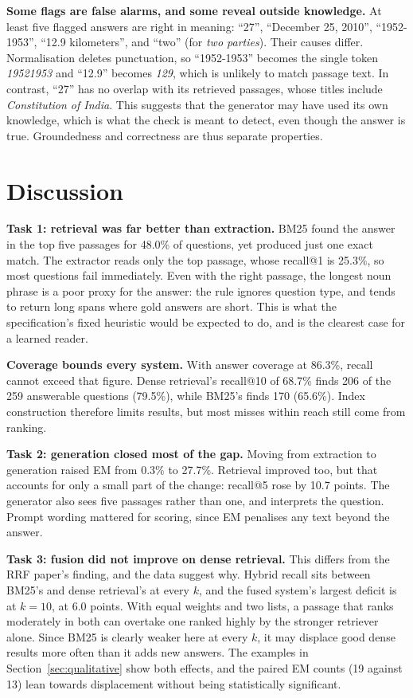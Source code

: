 \documentclass[11pt,a4paper]{article}
\begin{document}
\textbf{Some flags are false alarms, and some reveal outside knowledge.} At least five flagged answers are right in meaning: ``27'', ``December 25, 2010'', ``1952-1953'', ``12.9 kilometers'', and ``two'' (for \emph{two parties}). Their causes differ. Normalisation deletes punctuation, so ``1952-1953'' becomes the single token \emph{19521953} and ``12.9'' becomes \emph{129}, which is unlikely to match passage text. In contrast, ``27'' has no overlap with its retrieved passages, whose titles include \emph{Constitution of India}. This suggests that the generator may have used its own knowledge, which is what the check is meant to detect, even though the answer is true. Groundedness and correctness are thus separate properties.

\section{Discussion}
\label{sec:discussion}

\textbf{Task 1: retrieval was far better than extraction.} BM25 found the answer in the top five passages for 48.0\% of questions, yet produced just one exact match. The extractor reads only the top passage, whose recall@1 is 25.3\%, so most questions fail immediately. Even with the right passage, the longest noun phrase is a poor proxy for the answer: the rule ignores question type, and tends to return long spans where gold answers are short. This is what the specification's fixed heuristic would be expected to do, and is the clearest case for a learned reader.

\textbf{Coverage bounds every system.} With answer coverage at 86.3\%, recall cannot exceed that figure. Dense retrieval's recall@10 of 68.7\% finds 206 of the 259 answerable questions (79.5\%), while BM25's finds 170 (65.6\%). Index construction therefore limits results, but most misses within reach still come from ranking.

\textbf{Task 2: generation closed most of the gap.} Moving from extraction to generation raised EM from 0.3\% to 27.7\%. Retrieval improved too, but that accounts for only a small part of the change: recall@5 rose by 10.7 points. The generator also sees five passages rather than one, and interprets the question. Prompt wording mattered for scoring, since EM penalises any text beyond the answer.

\textbf{Task 3: fusion did not improve on dense retrieval.} This differs from the RRF paper's finding, and the data suggest why. Hybrid recall sits between BM25's and dense retrieval's at every $k$, and the fused system's largest deficit is at $k=10$, at 6.0 points. With equal weights and two lists, a passage that ranks moderately in both can overtake one ranked highly by the stronger retriever alone. Since BM25 is clearly weaker here at every $k$, it may displace good dense results more often than it adds new answers. The examples in Section~\ref{sec:qualitative} show both effects, and the paired EM counts (19 against 13) lean towards displacement without being statistically significant.
\end{document}
